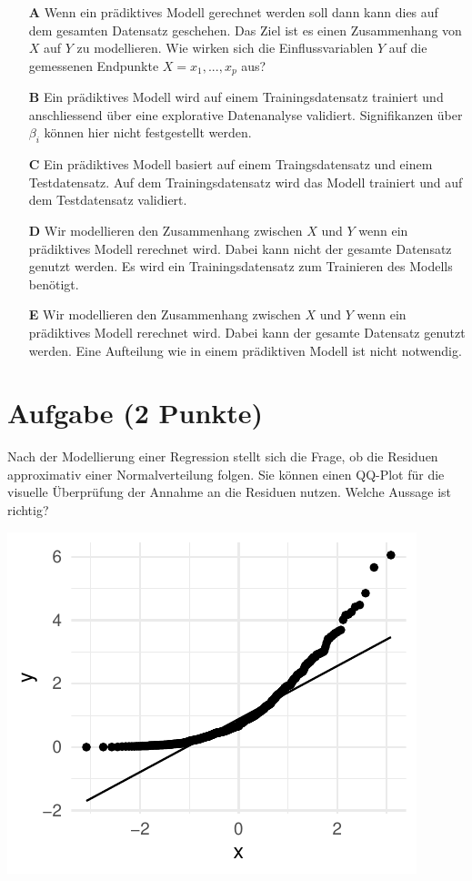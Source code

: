 \documentclass[a4paper, 9pt]{scrartcl}\usepackage[]{graphicx}\usepackage[]{xcolor}
\makeatletter
\def\maxwidth{ %
  \ifdim\Gin@nat@width>\linewidth
    \linewidth
  \else
    \Gin@nat@width
  \fi
}
\makeatother
\begin{document}
\begin{enumerate}
\item [\textbf{A} \msquare] Wenn ein prädiktives Modell gerechnet werden soll dann kann dies auf dem gesamten Datensatz geschehen. Das Ziel ist es einen Zusammenhang von $X$ auf $Y$ zu modellieren. Wie wirken sich die Einflussvariablen $Y$ auf die gemessenen Endpunkte $X = x_1, ..., x_p$ aus?
\item [\textbf{B} \msquare] Ein prädiktives Modell wird auf einem Trainingsdatensatz trainiert und anschliessend über eine explorative Datenanalyse validiert. Signifikanzen über $\beta_i$ können hier nicht festgestellt werden.
\item [\textbf{C} \msquare] Ein prädiktives Modell basiert auf einem Traingsdatensatz und einem Testdatensatz. Auf dem Trainingsdatensatz wird das Modell trainiert und auf dem Testdatensatz validiert.
\item [\textbf{D} \msquare] Wir modellieren den Zusammenhang zwischen $X$ und $Y$ wenn ein prädiktives Modell rerechnet wird. Dabei kann nicht der gesamte Datensatz genutzt werden. Es wird ein Trainingsdatensatz zum Trainieren des Modells benötigt.
\item [\textbf{E} \msquare] Wir modellieren den Zusammenhang zwischen $X$ und $Y$ wenn ein prädiktives Modell rerechnet wird. Dabei kann der gesamte Datensatz genutzt werden. Eine Aufteilung wie in einem prädiktiven Modell ist nicht notwendig.
\end{enumerate}

\section{Aufgabe \hfill (2 Punkte)}



Nach der Modellierung einer Regression stellt sich die Frage, ob die Residuen approximativ einer Normalverteilung folgen. Sie können einen QQ-Plot für die visuelle Überprüfung der Annahme an die Residuen nutzen. Welche Aussage ist richtig?



{\centering \includegraphics[width=\maxwidth]{img/mc-regression-05-a-1} 

}
\end{document}
